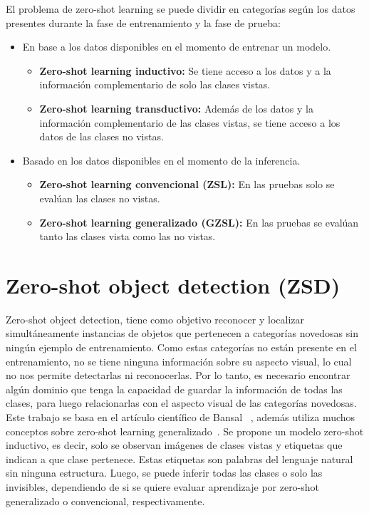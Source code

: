 El problema de zero-shot learning se puede dividir en categorías según los datos presentes durante la fase de entrenamiento y la fase de prueba:
\begin{itemize}
	\item En base a los datos disponibles en el momento de entrenar un modelo.
	\begin{itemize}
		\item \textbf{Zero-shot learning inductivo:} Se tiene acceso a los datos y a la información complementario de solo las clases vistas.
		\item \textbf{Zero-shot learning transductivo:} Además de los datos y la información complementario de las clases vistas,  se tiene acceso a los datos de las clases no vistas.
	\end{itemize}
	\item Basado en los datos disponibles en el momento de la inferencia.
	\begin{itemize}
		\item \textbf{Zero-shot learning convencional (ZSL):} En las pruebas solo se evalúan las clases no vistas.
		\item \textbf{Zero-shot learning generalizado (GZSL):} En las pruebas se evalúan tanto las clases vista como las no vistas.
	\end{itemize}
\end{itemize}

\section {Zero-shot object detection (ZSD)} \label{sec:zeroshotobjectdetection}
Zero-shot object detection, tiene como objetivo reconocer y localizar simultáneamente instancias de objetos que pertenecen a categorías novedosas sin ningún ejemplo de entrenamiento. Como estas categorías no están presente en el entrenamiento, no se tiene ninguna información sobre su aspecto visual, lo cual no nos permite detectarlas ni reconocerlas. Por lo tanto, es necesario encontrar algún dominio que tenga la capacidad de guardar la información de todas las clases, para luego relacionarlas con el aspecto visual de las categorías novedosas.\\

Este trabajo se basa en el artículo científico de Bansal \etal ~\cite{bansal2018zero}, además utiliza muchos conceptos sobre zero-shot learning generalizado~\cite{zero-shot-generalizado}. Se propone un modelo zero-shot  inductivo, es decir, solo se observan imágenes de clases vistas y etiquetas que indican a que clase pertenece. Estas etiquetas son palabras del lenguaje natural sin ninguna estructura. Luego, se puede inferir todas las clases o solo las invisibles, dependiendo de si se quiere evaluar aprendizaje por zero-shot  generalizado o convencional, respectivamente.\\ 

